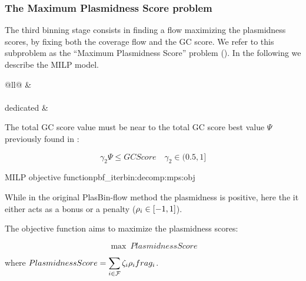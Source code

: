 \subsubsection{The Maximum Plasmidness Score problem \MPS{}}\label{sec:pbf_iterbin:decomp:mps}

The third binning stage consists in finding a flow maximizing the plasmidness scores, by fixing both the coverage flow and the GC score.
We refer to this subproblem as the \enquote{Maximum Plasmidness Score} problem (\MPS{}).
In the following we describe the MILP model.

\begin{table}[h!]
  \centering
  \label{tab:decomp:mps:cst}
  \begin{tabular}{@{}ll@{}}
    \toprule
     &  \\
    \midrule
     \\
    \addlinespace
    \MPS{} dedicated &  \\
    \bottomrule
  \end{tabular}
\end{table}

The total GC score value must be near to the total GC score best value \(\Psi{}\) previously found in \MGC{}:
\begin{Constraint}
  \begin{equation}
    \gamma_2 \Psi \leq GCScore \quad \gamma_2 \in (0.5, 1] %
    \label{pbf_iterbin:decomp:mps:cst:fix_mgc_obj} %
  \end{equation}
\end{Constraint}

\begin{definition}{\MPS{} MILP objective function}{pbf_iterbin:decomp:mps:obj}
  \begin{newfeatbox}
    While in the original PlasBin-flow method the plasmidness is positive, here the it either acts as a bonus or a penalty (\( \rho_{i} \in [-1, 1] \)).
  \end{newfeatbox}
  The objective function aims to maximize the plasmidness scores:
  \begin{Objective}
    \begin{equation}
      \max ~ PlasmidnessScore
      \label{pbf_iterbin:decomp:mps:obj:max_plasmidness_score} %
    \end{equation}
  \end{Objective}
  where \(\displaystyle PlasmidnessScore = \sum_{i \in \mathcal{F}{}} \zeta_{i} \rho_{i} frag_{i}\).
\end{definition}
